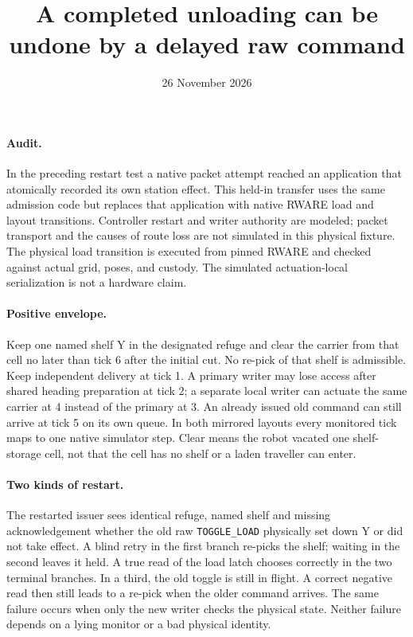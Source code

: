 \documentclass{article}
\title{A completed unloading can be undone by a delayed raw command}
\author{}
\date{26 November 2026}
\begin{document}
\maketitle
\paragraph{Audit.}
In the preceding restart test a native packet attempt reached an application
that atomically recorded its own station effect. This held-in transfer uses
the same admission code but replaces that application with native RWARE
load and layout transitions. Controller restart and writer authority are
modeled; packet transport and the causes of route loss are not simulated in
this physical fixture. The physical load transition is executed from pinned
RWARE and checked against actual grid, poses, and custody. The simulated
actuation-local serialization is not a hardware claim.

\paragraph{Positive envelope.}
Keep one named shelf Y in the designated refuge and clear the carrier from
that cell no later than tick 6 after the initial cut. No re-pick of that
shelf is admissible. Keep independent delivery at tick 1. A primary writer
may lose access after shared heading preparation at tick 2; a separate local
writer can actuate the same carrier at 4 instead of the primary at 3.
An already issued old command can still arrive at tick 5 on its own queue.
In both mirrored layouts every monitored tick maps to one native simulator
step. Clear means the robot vacated one shelf-storage cell, not that the
cell has no shelf or a laden traveller can enter.

\paragraph{Two kinds of restart.}
The restarted issuer sees identical refuge, named shelf and missing
acknowledgement whether the old raw \texttt{TOGGLE\_LOAD} physically set
down Y or did not take effect. A blind retry in the first branch re-picks
the shelf; waiting in the second leaves it held. A true read of the load
latch chooses correctly in the two terminal branches. In a third, the old
toggle is still in flight. A correct negative read then still leads to a
re-pick when the older command arrives. The same failure occurs when only
the new writer checks the physical state. Neither failure depends on
a lying monitor or a bad physical identity.
\end{document}
